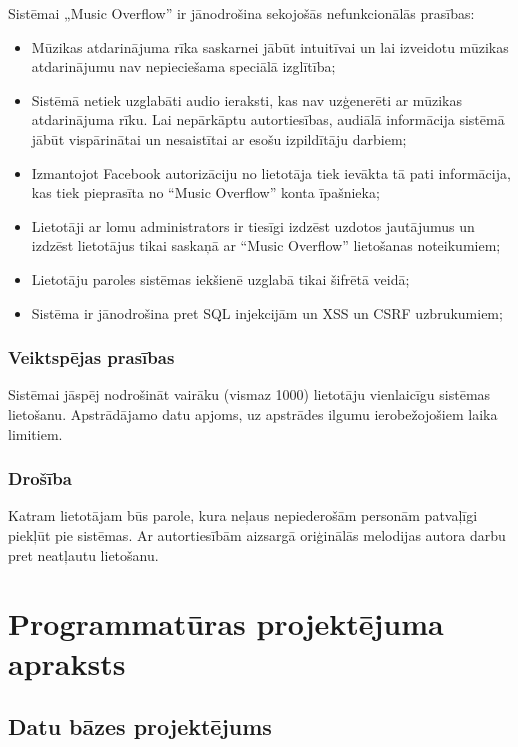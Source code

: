 \documentclass[12pt]{article}
\begin{document}
Sistēmai „Music Overflow” ir jānodrošina sekojošās nefunkcionālās prasības:
\begin{itemize}
	\item Mūzikas atdarinājuma rīka saskarnei jābūt intuitīvai un lai izveidotu mūzikas atdarinājumu nav nepieciešama speciālā izglītība;
	\item Sistēmā netiek uzglabāti audio ieraksti, kas nav uzģenerēti ar mūzikas atdarinājuma rīku. Lai nepārkāptu autortiesības, audiālā informācija sistēmā jābūt vispārinātai un nesaistītai ar esošu izpildītāju darbiem;
	\item Izmantojot Facebook autorizāciju no lietotāja tiek ievākta tā pati informācija, kas tiek pieprasīta no ``Music Overflow'' konta īpašnieka;
	\item Lietotāji ar lomu administrators ir tiesīgi izdzēst uzdotos jautājumus un izdzēst lietotājus tikai saskaņā ar ``Music Overflow'' lietošanas noteikumiem;
	\item Lietotāju paroles sistēmas iekšienē uzglabā tikai šifrētā veidā;
	\item Sistēma ir jānodrošina pret SQL injekcijām un XSS un CSRF uzbrukumiem;
	

\end{itemize}

\subsubsection{Veiktspējas prasības}

Sistēmai jāspēj nodrošināt vairāku (vismaz 1000) lietotāju vienlaicīgu sistēmas lietošanu. Apstrādājamo datu apjoms, uz apstrādes ilgumu ierobežojošiem laika limitiem.

\subsubsection{Drošība}

Katram lietotājam būs parole, kura neļaus nepiederošām personām patvaļīgi piekļūt pie sistēmas. Ar autortiesībām aizsargā oriģinālās melodijas autora darbu pret neatļautu lietošanu.

\pagebreak

\section{Programmatūras projektējuma apraksts}

\subsection{Datu bāzes projektējums}
\end{document}
